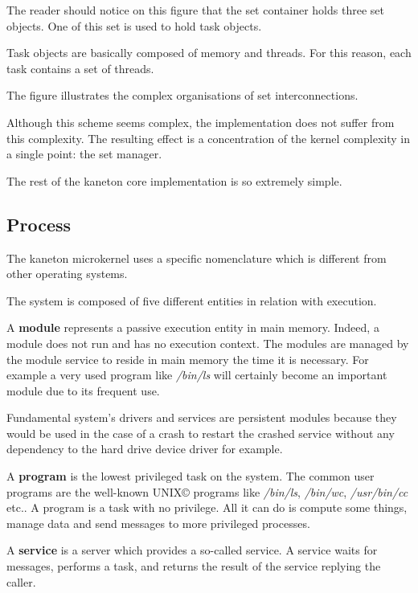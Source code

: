 {\begin{multicols}{2}

The reader should notice on this figure that the set container holds
three set objects. One of this set is used to hold task objects.

Task objects are basically composed of memory and threads. For this
reason, each task contains a set of threads.

The figure illustrates the complex organisations of set interconnections.

Although this scheme seems complex, the implementation does not
suffer from this complexity. The resulting effect is a concentration
of the kernel complexity in a single point: the set manager.

The rest of the kaneton core implementation is so extremely simple.

%
%

\subsection{Process}

The kaneton microkernel uses a specific nomenclature which is different
from other operating systems.

The system is composed of five different entities in relation with execution.

A \textbf{module} represents a passive execution entity in main memory.
Indeed, a module does not run and has no execution context. The modules are
managed by the module service to reside in main memory the time it is
necessary. For example a very used program like \textit{/bin/ls} will
certainly become an important module due to its frequent use.

Fundamental system's drivers and services are persistent modules because
they would be used in the case of a crash to restart the crashed service
without any dependency to the hard drive device driver for example.

A \textbf{program} is the lowest privileged task on the system.
The common user programs are the well-known UNIX{\scriptsize \copyright}
programs like \textit{/bin/ls}, \textit{/bin/wc}, \textit{/usr/bin/cc} etc..
A program is a task with no privilege. All it can do is compute some things,
manage data and send messages to more privileged processes.

A \textbf{service} is a server which provides a so-called service. A service
waits for messages, performs a task, and returns the result of the service
replying the caller.


\end{multicols}}
